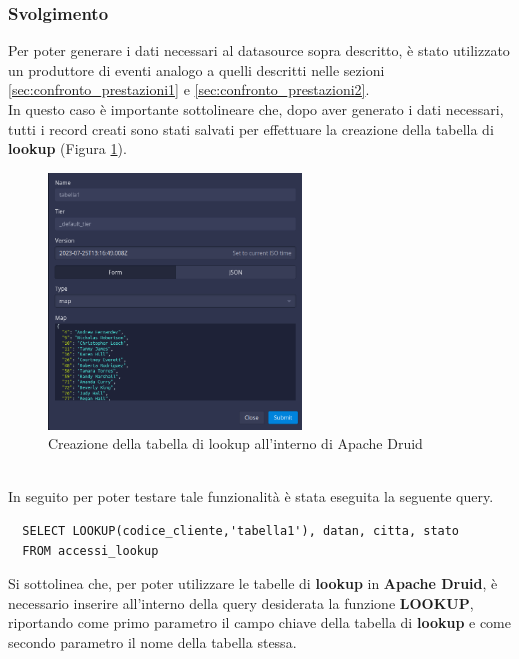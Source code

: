 \subsubsection{Svolgimento}
Per poter generare i dati necessari al \gls{datasource}{} sopra descritto, è stato utilizzato un produttore di eventi 
analogo a quelli descritti nelle sezioni \ref{sec:confronto_prestazioni1} e \ref{sec:confronto_prestazioni2}.\\
In questo caso è importante sottolineare che, dopo aver generato i dati necessari, tutti i 
record  creati sono stati salvati per effettuare la creazione della tabella di \textbf{lookup} (Figura \ref{fig:lookup}).\\
\begin{figure}[h]
  \centering
  \includegraphics[width=0.6\textwidth]{images/percorso/inserimento_lookup.png}
  \caption{Creazione della tabella di lookup all'interno di Apache Druid}
  \label{fig:lookup}
\end{figure}
\pagebreak
\\
In seguito per poter testare tale funzionalità è stata eseguita la seguente query.
\begin{lstlisting}
  SELECT LOOKUP(codice_cliente,'tabella1'), datan, citta, stato
  FROM accessi_lookup
\end{lstlisting}
Si sottolinea che, per poter utilizzare le tabelle di \textbf{lookup} in \textbf{Apache Druid}, 
è necessario
inserire all'interno della query desiderata la funzione \textbf{LOOKUP}, riportando come primo parametro il campo chiave della tabella di \textbf{lookup} e come secondo parametro il nome della tabella stessa.\\
